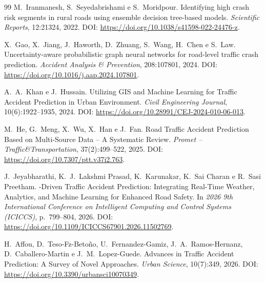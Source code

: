 \begin{thebibliography}{99}
M.~Iranmanesh, S.~Seyedabrishami e S.~Moridpour.
\newblock Identifying high crash risk segments in rural roads using ensemble decision tree-based models.
\newblock \emph{Scientific Reports}, 12:21324, 2022.
\newblock DOI: \url{https://doi.org/10.1038/s41598-022-24476-z}.

X.~Gao, X.~Jiang, J.~Haworth, D.~Zhuang, S.~Wang, H.~Chen e S.~Law.
\newblock Uncertainty-aware probabilistic graph neural networks for road-level traffic crash prediction.
\newblock \emph{Accident Analysis \& Prevention}, 208:107801, 2024.
\newblock DOI: \url{https://doi.org/10.1016/j.aap.2024.107801}.

A.~A.~Khan e J.~Hussain.
\newblock Utilizing {GIS} and Machine Learning for Traffic Accident Prediction in Urban Environment.
\newblock \emph{Civil Engineering Journal}, 10(6):1922--1935, 2024.
\newblock DOI: \url{https://doi.org/10.28991/CEJ-2024-010-06-013}.

M.~He, G.~Meng, X.~Wu, X.~Han e J.~Fan.
\newblock Road Traffic Accident Prediction Based on Multi-Source Data -- A Systematic Review.
\newblock \emph{Promet -- Traffic\&Transportation}, 37(2):499--522, 2025.
\newblock DOI: \url{https://doi.org/10.7307/ptt.v37i2.763}.

J.~Jeyabharathi, K.~J.~Lakshmi Prasad, K.~Karunakar, K.~Sai Charan e R.~Sasi Preetham.
-Driven Traffic Accident Prediction: Integrating Real-Time Weather, Analytics, and Machine Learning for Enhanced Road Safety.
\newblock In \emph{2026 9th International Conference on Intelligent Computing and Control Systems (ICICCS)}, p.~799--804, 2026.
\newblock DOI: \url{https://doi.org/10.1109/ICICCS67901.2026.11502769}.

H.~Affou, D.~Teso-Fz-Beto{\~n}o, U.~Fernandez-Gamiz, J.~A.~Ramos-Hernanz, D.~Caballero-Martin e J.~M.~Lopez-Guede.
\newblock Advances in Traffic Accident Prediction: A Survey of Novel Approaches.
\newblock \emph{Urban Science}, 10(7):349, 2026.
\newblock DOI: \url{https://doi.org/10.3390/urbansci10070349}.

\end{thebibliography}
